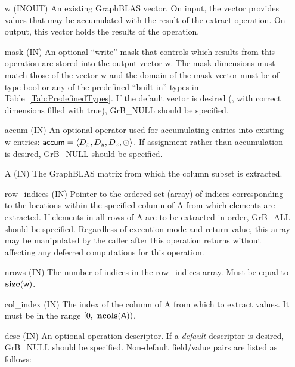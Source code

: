 \begin{itemize}[leftmargin=1in]
    \item[{\sf w}]    ({\sf INOUT}) An existing GraphBLAS vector.  On input,
    the vector provides values that may be accumulated with the result of the
    extract operation.  On output, this vector holds the results of the
    operation.

    \item[{\sf mask}] ({\sf IN}) An optional ``write'' mask that controls which
    results from this operation are stored into the output vector {\sf w}. The 
    mask dimensions must match those of the vector {\sf w} and the domain of the
    {\sf mask} vector must be of type {\sf bool} or any of the predefined 
    ``built-in'' types in Table~\ref{Tab:PredefinedTypes}.  If the default vector
    is desired (\ie, with correct dimensions filled with {\sf true}), 
    {\sf GrB\_NULL} should be specified.

    \item[{\sf accum}]    ({\sf IN}) An optional operator used for accumulating
    entries into existing {\sf w} entries: ${\sf accum} = \langle D_x,
    D_y, D_z,\odot \rangle$. If assignment rather than accumulation is
    desired, {\sf GrB\_NULL} should be specified.

    \item[{\sf A}]     ({\sf IN})  The GraphBLAS matrix from which the column
    subset is extracted.

    \item[{\sf row\_indices}] ({\sf IN}) Pointer to the ordered set (array) of 
    indices corresponding to the locations within the specified column of {\sf A} 
    from which elements are extracted.  If elements in all rows of {\sf A} are 
    to be extracted in order, {\sf GrB\_ALL} should be specified. Regardless of
    execution mode and return value, this array may be manipulated by the caller 
    after this operation returns without affecting any deferred computations for 
    this operation.
    
    \item[{\sf nrows}] ({\sf IN}) The number of indices in the {\sf row\_indices}
    array.  Must be equal to $\bold{size}({\sf w})$.
    
    \item[{\sf col\_index}]  ({\sf IN}) The index of the column of {\sf A} from
    which to extract values.  It must be in the range $[0,\ \bold{ncols}({\sf A}))$.

    \item[{\sf desc}] ({\sf IN}) An optional operation descriptor. If
    a \emph{default} descriptor is desired, {\sf GrB\_NULL} should be
    specified. Non-default field/value pairs are listed as follows:  \\


\end{itemize}
